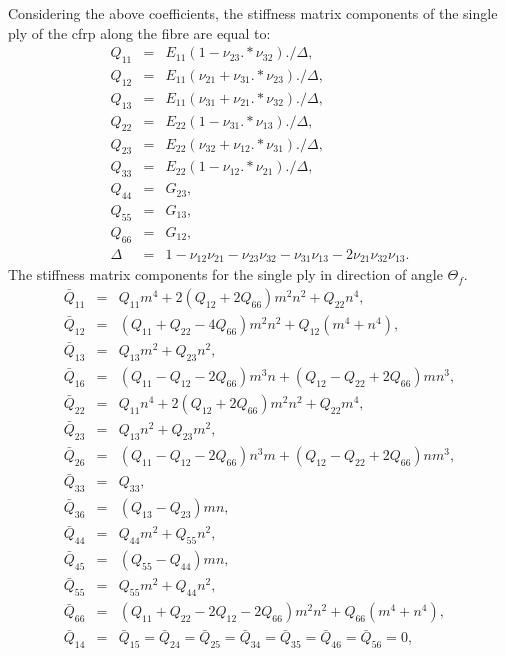Considering the above coefficients, the stiffness matrix components of the single ply of the \ac{cfrp} along the fibre are equal to:
\begin{eqnarray}
	Q_{11} &=& E_{11}(1-\nu_{23}.*\nu_{32})./\Delta,\nonumber\\
	Q_{12} &=& E_{11}(\nu_{21}+\nu_{31}.*\nu_{23})./\Delta,\nonumber\\
	Q_{13} &=& E_{11}(\nu_{31}+\nu_{21}.*\nu_{32})./\Delta,\nonumber\\
	Q_{22} &=& E_{22}(1-\nu_{31}.*\nu_{13})./\Delta,\nonumber\\
	Q_{23} &=& E_{22}(\nu_{32}+\nu_{12}.*\nu_{31})./\Delta,\\
	Q_{33} &=& E_{22}(1-\nu_{12}.*\nu_{21})./\Delta,\nonumber\\
	Q_{44} &=& G_{23},\nonumber\\
	Q_{55} &=& G_{13},\nonumber\\
	Q_{66} &=& G_{12},\nonumber\\
	\Delta &=& 1-\nu_{12}\nu_{21}-\nu_{23}\nu_{32}-\nu_{31}\nu_{13}-2\nu_{21}\nu_{32}\nu_{13}.\nonumber
\end{eqnarray}
The stiffness matrix components for the single ply in direction of angle \(\Theta_f\).
\begin{eqnarray}
	\bar{Q}_{11} &=& Q_{11}m^4+2(Q_{12}+2Q_{66})m^2n^2+Q_{22}n^4,\nonumber\\
	\bar{Q}_{12} &=& (Q_{11}+Q_{22}-4Q_{66})m^2n^2+Q_{12}(m^4+n^4),\nonumber\\
	\bar{Q}_{13} &=& Q_{13}m^2+Q_{23}n^2,\nonumber\\
	\bar{Q}_{16} &=& (Q_{11}-Q_{12}-2Q_{66})m^3n+(Q_{12}-Q_{22}+2Q_{66})mn^3,\nonumber\\
	\bar{Q}_{22} &=& Q_{11}n^4+2(Q_{12}+2Q_{66})m^2n^2+Q_{22}m^4,\nonumber\\
	\bar{Q}_{23} &=& Q_{13}n^2+Q_{23}m^2,\nonumber\\
	\bar{Q}_{26} &=& (Q_{11}-Q_{12}-2Q_{66})n^3m+(Q_{12}-Q_{22}+2Q_{66})nm^3,\nonumber\\
	\bar{Q}_{33} &=& Q_{33},\\
	\bar{Q}_{36} &=& (Q_{13}-Q_{23})mn,\nonumber\\
	\bar{Q}_{44} &=& Q_{44}m^2+Q_{55}n^2,\nonumber\\
	\bar{Q}_{45} &=& (Q_{55}-Q_{44})mn,\nonumber\\
	\bar{Q}_{55} &=& Q_{55}m^2+Q_{44}n^2,\nonumber\\ \bar{Q}_{66} &=& (Q_{11}+Q_{22}-2Q_{12}-2Q_{66})m^2n^2+Q_{66}(m^4+n^4),\nonumber\\
	\bar{Q}_{14} &=&\bar{Q}_{15} = \bar{Q}_{24} = \bar{Q}_25 = \bar{Q}_{34} = \bar{Q}_{35} = \bar{Q}_{46} = \bar{Q}_{56} = 0,\nonumber
\end{eqnarray}
